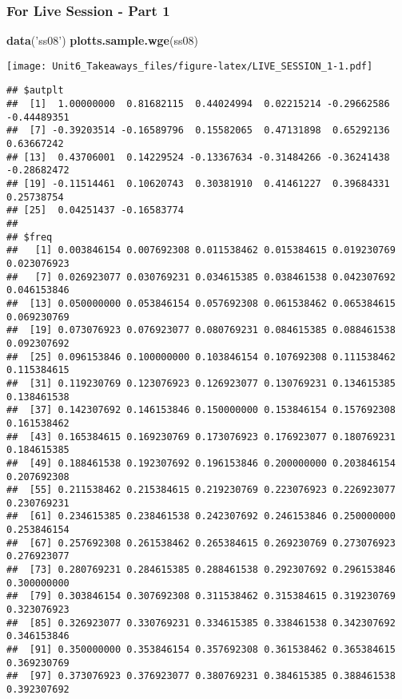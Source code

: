 \documentclass[
]{article}
\newenvironment{Shaded}{\begin{snugshade}}{\end{snugshade}}
\newcommand{\KeywordTok}[1]{\textcolor[rgb]{0.13,0.29,0.53}{\textbf{#1}}}
\newcommand{\NormalTok}[1]{#1}
\newcommand{\StringTok}[1]{\textcolor[rgb]{0.31,0.60,0.02}{#1}}
\begin{document}
\hypertarget{for-live-session---part-1}{%
\subsubsection{For Live Session - Part
1}\label{for-live-session---part-1}}

\begin{Shaded}
\begin{Highlighting}[]
\KeywordTok{data}\NormalTok{(}\StringTok{'ss08'}\NormalTok{)}
\KeywordTok{plotts.sample.wge}\NormalTok{(ss08)}
\end{Highlighting}
\end{Shaded}

\texttt{[image: Unit6\_Takeaways\_files/figure-latex/LIVE\_SESSION\_1-1.pdf]}

\begin{verbatim}
## $autplt
##  [1]  1.00000000  0.81682115  0.44024994  0.02215214 -0.29662586 -0.44489351
##  [7] -0.39203514 -0.16589796  0.15582065  0.47131898  0.65292136  0.63667242
## [13]  0.43706001  0.14229524 -0.13367634 -0.31484266 -0.36241438 -0.28682472
## [19] -0.11514461  0.10620743  0.30381910  0.41461227  0.39684331  0.25738754
## [25]  0.04251437 -0.16583774
## 
## $freq
##   [1] 0.003846154 0.007692308 0.011538462 0.015384615 0.019230769 0.023076923
##   [7] 0.026923077 0.030769231 0.034615385 0.038461538 0.042307692 0.046153846
##  [13] 0.050000000 0.053846154 0.057692308 0.061538462 0.065384615 0.069230769
##  [19] 0.073076923 0.076923077 0.080769231 0.084615385 0.088461538 0.092307692
##  [25] 0.096153846 0.100000000 0.103846154 0.107692308 0.111538462 0.115384615
##  [31] 0.119230769 0.123076923 0.126923077 0.130769231 0.134615385 0.138461538
##  [37] 0.142307692 0.146153846 0.150000000 0.153846154 0.157692308 0.161538462
##  [43] 0.165384615 0.169230769 0.173076923 0.176923077 0.180769231 0.184615385
##  [49] 0.188461538 0.192307692 0.196153846 0.200000000 0.203846154 0.207692308
##  [55] 0.211538462 0.215384615 0.219230769 0.223076923 0.226923077 0.230769231
##  [61] 0.234615385 0.238461538 0.242307692 0.246153846 0.250000000 0.253846154
##  [67] 0.257692308 0.261538462 0.265384615 0.269230769 0.273076923 0.276923077
##  [73] 0.280769231 0.284615385 0.288461538 0.292307692 0.296153846 0.300000000
##  [79] 0.303846154 0.307692308 0.311538462 0.315384615 0.319230769 0.323076923
##  [85] 0.326923077 0.330769231 0.334615385 0.338461538 0.342307692 0.346153846
##  [91] 0.350000000 0.353846154 0.357692308 0.361538462 0.365384615 0.369230769
##  [97] 0.373076923 0.376923077 0.380769231 0.384615385 0.388461538 0.392307692

\end{verbatim}
\end{document}

